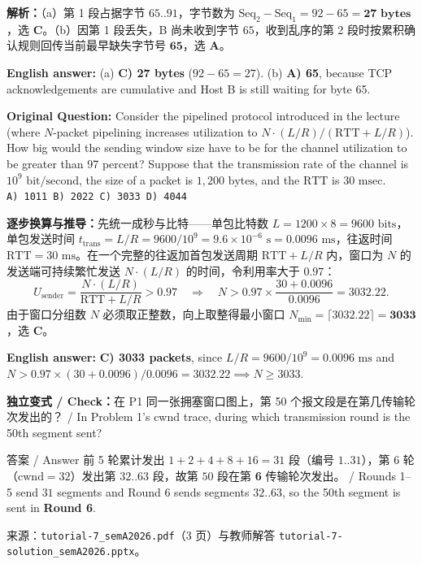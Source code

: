 \textbf{解析：}（a）第 1 段占据字节 $65..91$，字节数为 $\mathrm{Seq}_2 - \mathrm{Seq}_1 = 92 - 65 = \mathbf{27\text{ bytes}}$，选 \textbf{C}。（b）因第 1 段丢失，B 尚未收到字节 $65$，收到乱序的第 2 段时按累积确认规则回传当前最早缺失字节号 $\mathbf{65}$，选 \textbf{A}。

\textbf{English answer:} (a) \textbf{C) 27 bytes} ($92 - 65 = 27$). (b) \textbf{A) 65}, because TCP acknowledgements are cumulative and Host B is still waiting for byte 65.



\textbf{Original Question:} Consider the pipelined protocol introduced in the lecture (where $N$-packet pipelining increases utilization to $N\cdot(L/R)/(\mathrm{RTT}+L/R)$). How big would the sending window size have to be for the channel utilization to be greater than 97 percent? Suppose that the transmission rate of the channel is $10^9\text{ bit/second}$, the size of a packet is $1{,}200\text{ bytes}$, and the $\mathrm{RTT}$ is $30\text{ msec}$. \\
\texttt{A) 1011 \quad B) 2022 \quad C) 3033 \quad D) 4044}

\textbf{逐步换算与推导：}先统一成秒与比特——单包比特数 $L = 1200 \times 8 = 9600\text{ bits}$，单包发送时间 $t_{\mathrm{trans}} = L/R = 9600 / 10^9 = 9.6 \times 10^{-6}\text{ s} = 0.0096\text{ ms}$，往返时间 $\mathrm{RTT} = 30\text{ ms}$。在一个完整的往返加首包发送周期 $\mathrm{RTT} + L/R$ 内，窗口为 $N$ 的发送端可持续繁忙发送 $N \cdot (L/R)$ 的时间，令利用率大于 $0.97$：
\[
U_{\mathrm{sender}} = \frac{N \cdot (L / R)}{\mathrm{RTT} + L / R} > 0.97
\quad\Longrightarrow\quad
N > 0.97 \times \frac{30 + 0.0096}{0.0096} = 3032.22.
\tag{T7.1}
\]
由于窗口分组数 $N$ 必须取正整数，向上取整得最小窗口 $N_{\min} = \lceil 3032.22\rceil = \mathbf{3033}$，选 \textbf{C}。

\textbf{English answer:} \textbf{C) 3033 packets}, since $L/R = 9600/10^9 = 0.0096\text{ ms}$ and $N > 0.97\times(30 + 0.0096)/0.0096 = 3032.22 \implies N \ge 3033$.

\textbf{独立变式 / Check：}在 P1 同一张拥塞窗口图上，第 50 个报文段是在第几传输轮次发出的？ / In Problem 1's cwnd trace, during which transmission round is the 50th segment sent?

\begin{StudySolution}{答案 / Answer}
前 5 轮累计发出 $1 + 2 + 4 + 8 + 16 = 31$ 段（编号 $1..31$），第 6 轮（$\mathrm{cwnd}=32$）发出第 $32..63$ 段，故第 $50$ 段在第 \textbf{6} 传输轮次发出。 / Rounds 1–5 send $31$ segments and Round 6 sends segments $32..63$, so the 50th segment is sent in \textbf{Round 6}.
\end{StudySolution}

来源：\texttt{tutorial-7\_semA2026.pdf}（3 页）与教师解答 \texttt{tutorial-7-solution\_semA2026.pptx}。
